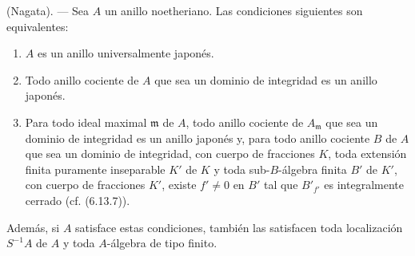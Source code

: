 \begin{theorem}[7.7.2]
(Nagata). --- Sea $A$ un anillo noetheriano. Las condiciones siguientes son
equivalentes:
\begin{enumerate}
\item[\emph{a)}] $A$ es un anillo universalmente japonés.
\item[\emph{b)}] Todo anillo cociente de $A$ que sea un dominio de integridad
es un anillo japonés.
\item[\emph{c)}] Para todo ideal maximal $\mathfrak m$ de $A$, todo anillo
cociente de $A_{\mathfrak m}$ que sea un dominio de integridad es un anillo
japonés y, para todo anillo cociente $B$ de $A$ que sea un dominio de
integridad, con cuerpo de fracciones $K$, toda extensión finita puramente
inseparable $K'$ de $K$ y toda sub-$B$-álgebra finita $B'$ de $K'$, con
cuerpo de fracciones $K'$, existe $f'\neq0$ en $B'$ tal que $B'_{f'}$ es
integralmente cerrado \textup{(cf. (6.13.7))}.
\end{enumerate}

Además, si $A$ satisface estas condiciones, también las satisfacen toda
localización $S^{-1}A$ de $A$ y toda $A$-álgebra de tipo finito.
\end{theorem}

